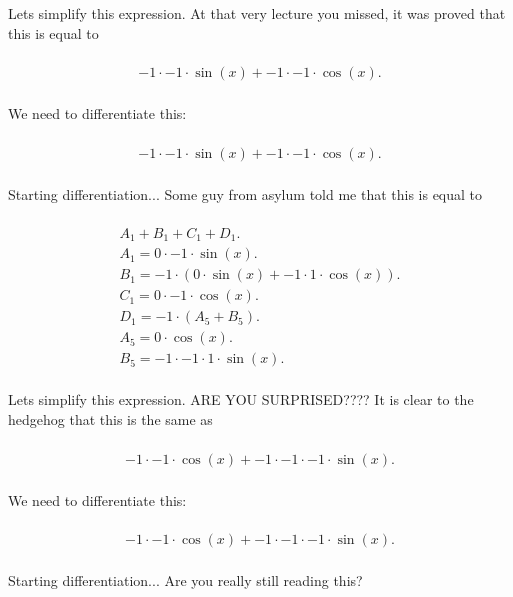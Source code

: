 \documentclass[12pt,a4paper]{extreport}
\begin{document}
Lets simplify this expression.
At that very lecture you missed, it was proved that this is equal to 

\begin{multline}
\\
-1 \cdot -1 \cdot \sin(x) + -1 \cdot -1 \cdot \cos(x).\\
\end{multline}


We need to differentiate this:


\begin{multline}
\\
-1 \cdot -1 \cdot \sin(x) + -1 \cdot -1 \cdot \cos(x).\\
\end{multline}


Starting differentiation... 
Some guy from asylum \cite{Anton} told me that this is equal to 

\begin{multline}
\\
A_{1} + B_{1} + C_{1} + D_{1}.\\
A_{1} = 0 \cdot -1 \cdot \sin(x).\\
B_{1} = -1 \cdot (0 \cdot \sin(x) + -1 \cdot 1 \cdot \cos(x)).\\
C_{1} = 0 \cdot -1 \cdot \cos(x).\\
D_{1} = -1 \cdot (A_{5} + B_{5}).\\
A_{5} = 0 \cdot \cos(x).\\
B_{5} = -1 \cdot -1 \cdot 1 \cdot \sin(x).\\
\end{multline}


Lets simplify this expression.
ARE YOU SURPRISED????\cite{Dashkov} It is clear to the hedgehog that this is the same as 

\begin{multline}
\\
-1 \cdot -1 \cdot \cos(x) + -1 \cdot -1 \cdot -1 \cdot \sin(x).\\
\end{multline}


We need to differentiate this:


\begin{multline}
\\
-1 \cdot -1 \cdot \cos(x) + -1 \cdot -1 \cdot -1 \cdot \sin(x).\\
\end{multline}


Starting differentiation... 
Are you really still reading this? 
\end{document}
